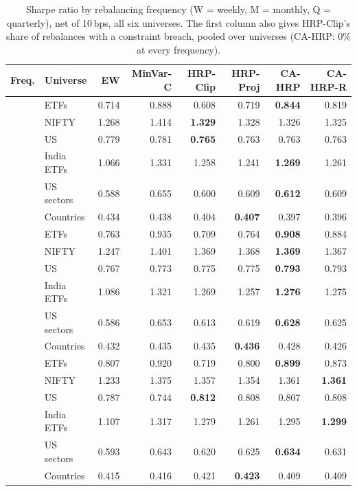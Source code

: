 \begin{table}[!htbp]\centering\small
\caption{Sharpe ratio by rebalancing frequency (W = weekly, M = monthly, Q = quarterly), net of 10\,bps, all six universes. The first column also gives HRP-Clip's share of rebalances with a constraint breach, pooled over universes (CA-HRP: 0\% at every frequency).}\label{tab:freq}
\setlength{\tabcolsep}{3.5pt}\begin{tabular}{ll rrrrrr}\toprule
Freq. & Universe & EW & MinVar-C & HRP-Clip & HRP-Proj & CA-HRP & CA-HRP-R\\\midrule
{} & ETFs & 0.714 & 0.888 & 0.608 & 0.719 & \textbf{0.844} & 0.819\\
 & NIFTY & 1.268 & 1.414 & \textbf{1.329} & 1.328 & 1.326 & 1.325\\
 & US & 0.779 & 0.781 & \textbf{0.765} & 0.763 & 0.763 & 0.763\\
 & India ETFs & 1.066 & 1.331 & 1.258 & 1.241 & \textbf{1.269} & 1.261\\
 & US sectors & 0.588 & 0.655 & 0.600 & 0.609 & \textbf{0.612} & 0.609\\
 & Countries & 0.434 & 0.438 & 0.404 & \textbf{0.407} & 0.397 & 0.396\\
\midrule
{} & ETFs & 0.763 & 0.935 & 0.709 & 0.764 & \textbf{0.908} & 0.884\\
 & NIFTY & 1.247 & 1.401 & 1.369 & 1.368 & \textbf{1.369} & 1.367\\
 & US & 0.767 & 0.773 & 0.775 & 0.775 & \textbf{0.793} & 0.793\\
 & India ETFs & 1.086 & 1.321 & 1.269 & 1.257 & \textbf{1.276} & 1.275\\
 & US sectors & 0.586 & 0.653 & 0.613 & 0.619 & \textbf{0.628} & 0.625\\
 & Countries & 0.432 & 0.435 & 0.435 & \textbf{0.436} & 0.428 & 0.426\\
\midrule
{} & ETFs & 0.807 & 0.920 & 0.719 & 0.800 & \textbf{0.899} & 0.873\\
 & NIFTY & 1.233 & 1.375 & 1.357 & 1.354 & 1.361 & \textbf{1.361}\\
 & US & 0.787 & 0.744 & \textbf{0.812} & 0.808 & 0.807 & 0.808\\
 & India ETFs & 1.107 & 1.317 & 1.279 & 1.261 & 1.295 & \textbf{1.299}\\
 & US sectors & 0.593 & 0.643 & 0.620 & 0.625 & \textbf{0.634} & 0.631\\
 & Countries & 0.415 & 0.416 & 0.421 & \textbf{0.423} & 0.409 & 0.409\\
\bottomrule
\end{tabular}\end{table}